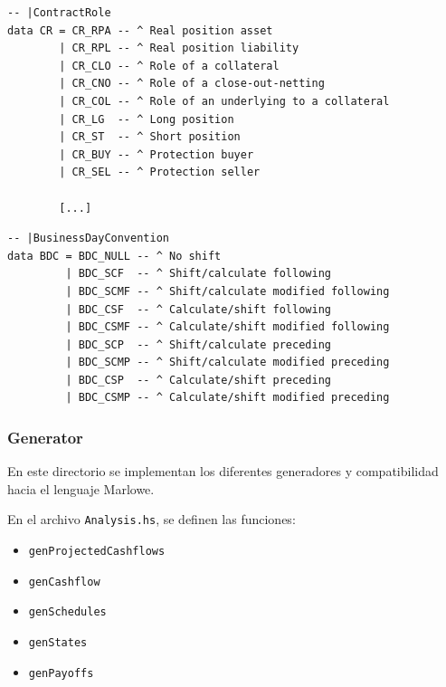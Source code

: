 \documentclass[12pt]{book}
\begin{document}
\begin{lstlisting}[style=Haskell-cardano, caption=Algunos tipos de roles de contrato.]
-- |ContractRole
data CR = CR_RPA -- ^ Real position asset
        | CR_RPL -- ^ Real position liability
        | CR_CLO -- ^ Role of a collateral
        | CR_CNO -- ^ Role of a close-out-netting
        | CR_COL -- ^ Role of an underlying to a collateral
        | CR_LG  -- ^ Long position
        | CR_ST  -- ^ Short position
        | CR_BUY -- ^ Protection buyer
        | CR_SEL -- ^ Protection seller

        [...]
\end{lstlisting}


\begin{lstlisting}[style=Haskell-cardano, caption=Tipos de convención sobre días laborables.]
-- |BusinessDayConvention
data BDC = BDC_NULL -- ^ No shift
         | BDC_SCF  -- ^ Shift/calculate following
         | BDC_SCMF -- ^ Shift/calculate modified following
         | BDC_CSF  -- ^ Calculate/shift following
         | BDC_CSMF -- ^ Calculate/shift modified following
         | BDC_SCP  -- ^ Shift/calculate preceding
         | BDC_SCMP -- ^ Shift/calculate modified preceding
         | BDC_CSP  -- ^ Calculate/shift preceding
         | BDC_CSMP -- ^ Calculate/shift modified preceding
\end{lstlisting}


\subsubsection{Generator}

En este directorio se implementan los diferentes generadores y compatibilidad hacia el lenguaje Marlowe.



En el archivo \texttt{Analysis.hs}, se definen las funciones:

\begin{itemize}
    \item \texttt{genProjectedCashflows}
    \item \texttt{genCashflow}
    \item \texttt{genSchedules}
    \item \texttt{genStates}
    \item \texttt{genPayoffs}
\end{itemize}
\end{document}
